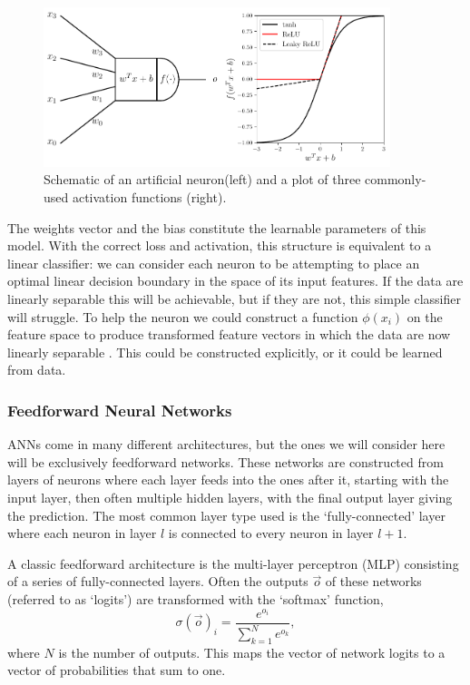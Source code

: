 \begin{figure}[h!]
    \begin{center}
        \includegraphics[width=0.9\textwidth]{figures/machine_learning/neuron_and_activation.pdf}
    \end{center}
    \caption{Schematic of an artificial neuron(left) and a plot of three commonly-used activation functions (right).}
        \label{fig:machine_learning:neuron_and_activation}
\end{figure}

The weights vector and the bias constitute the learnable parameters of this model. 
With the correct loss and activation, this structure is equivalent to a linear classifier: we can consider each neuron to be attempting to place an optimal linear decision boundary in the space of its input features. 
If the data are linearly separable this will be achievable, but if they are not, this simple classifier will struggle. 
To help the neuron we could construct a function $\phi(x_{i})$ on the feature space to produce transformed feature vectors in which the data are now linearly separable \cite{DeepLearningBook}. 
This could be constructed explicitly, or it could be learned from data. 



\subsubsection{Feedforward Neural Networks}
ANNs come in many different architectures, but the ones we will consider here will be exclusively feedforward networks. 
These networks are constructed from layers of neurons where each layer feeds into the ones after it, starting with the input layer, then often multiple hidden layers, with the final output layer giving the prediction. 
The most common layer type used is the `fully-connected' layer where each neuron in layer $l$ is connected to every neuron in layer $l+1$. 

A classic feedforward architecture is the multi-layer perceptron (MLP) consisting of a series of fully-connected layers. Often the outputs $\vec{o}$ of these networks (referred to as `logits') are transformed with the `softmax' function,
\begin{equation}
    \sigma(\vec{o})_{i} = \frac{e^{o_{i}}}{\sum_{k=1}^{N}e^{o_{k}}},
\end{equation}
where $N$ is the number of outputs. 
This maps the vector of network logits to a vector of probabilities that sum to one.

